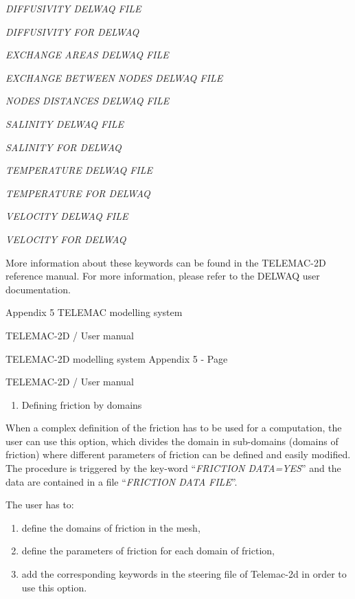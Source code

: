 \documentclass{article} %
\begin{document}
 \textit{DIFFUSIVITY DELWAQ FILE}

 \textit{DIFFUSIVITY FOR DELWAQ}

 \textit{EXCHANGE AREAS DELWAQ FILE}

 \textit{EXCHANGE BETWEEN NODES DELWAQ FILE}

 \textit{NODES DISTANCES DELWAQ FILE}

 \textit{SALINITY DELWAQ FILE}

 \textit{SALINITY FOR DELWAQ}

 \textit{TEMPERATURE DELWAQ FILE}

 \textit{TEMPERATURE FOR DELWAQ}

 \textit{VELOCITY DELWAQ FILE}

 \textit{VELOCITY FOR DELWAQ}

 More information about these keywords can be found in the TELEMAC-2D reference manual. For more information, please refer to the DELWAQ user documentation.











 Appendix 5 TELEMAC modelling system

 TELEMAC-2D / User manual



 TELEMAC-2D modelling system Appendix 5 - Page

 TELEMAC-2D / User manual





\begin{enumerate}
\item   Defining friction by domains
\end{enumerate}

 When a complex definition of the friction has to be used for a computation, the user can use this option, which divides the domain in sub-domains (domains of friction) where different parameters of friction can be defined and easily modified. The procedure is triggered by the key-word ``\textit{FRICTION DATA=YES}'' and the data are contained in a file ``\textit{FRICTION DATA FILE}''.

 The user has to:

\begin{enumerate}
\item  define the domains of friction in the mesh,

\item  define the parameters of friction for each domain of friction,

\item  add the corresponding keywords in the steering file of Telemac-2d in order to use this option.
\end{enumerate}
\end{document}
